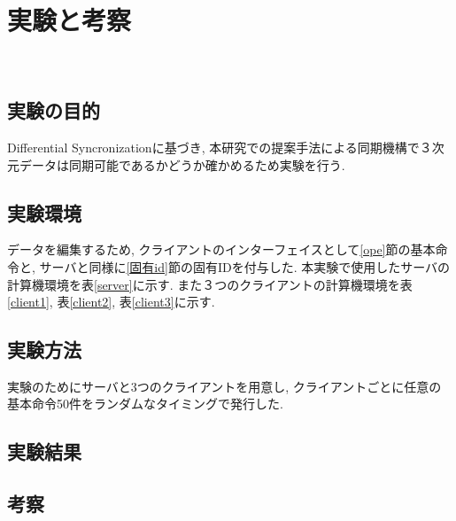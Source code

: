 \chapter{実験と考察}　\label{chap:test}
\section{実験の目的}
Differential Syncronizationに基づき, 本研究での提案手法による同期機構で３次元データは同期可能であるかどうか確かめるため実験を行う.
\section{実験環境}
データを編集するため, クライアントのインターフェイスとして\ref{ope}節の基本命令と, サーバと同様に\ref{固有id}節の固有IDを付与した.
本実験で使用したサーバの計算機環境を表\ref{server}に示す. また３つのクライアントの計算機環境を表\ref{client1}, 表\ref{client2}, 表\ref{client3}に示す.
\section{実験方法}
実験のためにサーバと3つのクライアントを用意し, クライアントごとに任意の基本命令50件をランダムなタイミングで発行した.

\section{実験結果}
\section{考察}
